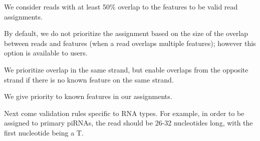 \documentclass[12pt,twoside]{reedthesis}
\newenvironment{Shaded}{\begin{snugshade}}{\end{snugshade}}
\newcommand{\ConstantTok}[1]{\textcolor[rgb]{0.00,0.00,0.00}{#1}}
\newcommand{\DecValTok}[1]{\textcolor[rgb]{0.00,0.00,0.81}{#1}}
\newcommand{\FloatTok}[1]{\textcolor[rgb]{0.00,0.00,0.81}{#1}}
\newcommand{\NormalTok}[1]{#1}
\newcommand{\SpecialCharTok}[1]{\textcolor[rgb]{0.00,0.00,0.00}{#1}}
\newcommand{\StringTok}[1]{\textcolor[rgb]{0.31,0.60,0.02}{#1}}
\begin{document}
We consider reads with at least 50\% overlap to the features to be valid
read assignments.
\begin{Shaded}
\end{Shaded}
By default, we do not prioritize the assignment based on the size of the
overlap between reads and features (when a read overlaps multiple
features); however this option is available to users.
\begin{Shaded}
\end{Shaded}
We prioritize overlap in the same strand, but enable overlaps from the
opposite strand if there is no known feature on the same strand.
\begin{Shaded}
\end{Shaded}
We give priority to known features in our assignments.
\begin{Shaded}
\end{Shaded}
Next come validation rules specific to RNA types. For example, in order
to be assigned to primary piRNAs, the read should be 26-32 nucleotides
long, with the first nucleotide being a T.
\end{document}
